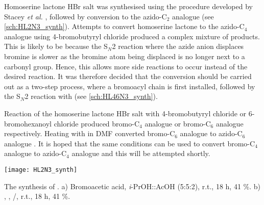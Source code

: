 Homoserine lactone HBr salt  was synthesised using the procedure developed by Stacey \textit{et al.} \cite{Stacy2013}, followed by conversion to the azido-C$_2$ analogue  (see \ref{sch:HL2N3_synth}). Attempts to convert homoserine lactone  to the azido-C$_4$ analogue using 4-bromobutyryl chloride  produced a complex mixture of products. This is likely to be because the S$_N$2 reaction where the azide anion displaces bromine is slower as the bromine atom being displaced is no longer next to a carbonyl group. Hence, this allows more side reactions to occur instead of the desired reaction. It was therefore decided that the conversion should be carried out as a two-step process, where a bromoacyl chain is first installed, followed by the S$_N$2 reaction with  (see \ref{sch:HL46N3_synth}). 

Reaction of the homoserine lactone HBr salt  with 4-bromobutyryl chloride  or 6-bromohexanoyl chloride  produced bromo-C$_4$ analogue  or bromo-C$_6$ analogue  respectively. Heating with  in DMF converted bromo-C$_6$ analogue  to azido-C$_6$ analogue \cite{Baker2012}. It is hoped that the same conditions can be used to convert bromo-C$_4$ analogue  to azido-C$_4$ analogue  and this will be attempted shortly.

\begin{scheme}[H]
	\begin{center}
		\texttt{[image: HL2N3\_synth]}
		\caption{The synthesis of .
		a) Bromoacetic acid, \textit{i}-PrOH::AcOH (5:5:2), r.t., 18 h, 41 \%.
		b) , , /, r.t., 18 h, 41 \%.
		\label{sch:HL2N3_synth}}
	\end{center}
\end{scheme}
%

